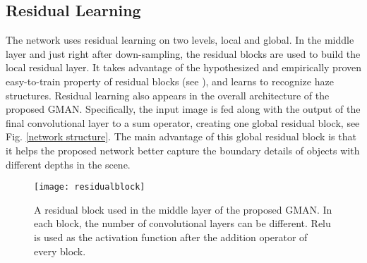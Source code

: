 \documentclass[journal]{IEEEtran}
\begin{document}
\subsection{Residual Learning}


The network uses residual learning on two levels, local and global. In the middle layer and just right after down-sampling, the residual blocks are used to build the local residual layer. It takes advantage of the hypothesized and empirically proven \cite{kim2016accurate,zhang2017beyond,szegedy2017inception,ren2017faster} easy-to-train property of residual blocks (see \cite{ResNet}), and learns to recognize haze structures. Residual learning also appears in the overall architecture of the proposed GMAN. Specifically, the input image is fed along with the output of the final convolutional layer to a sum operator, creating one global residual block, see Fig. \ref{network structure}. The main advantage of this global residual block is that it helps the proposed network better capture the boundary details of objects with different depths in the scene.

\begin{figure}
	\centering
 \texttt{[image: residualblock]}
	\captionsetup{justification=centering}
	\centering\caption{A residual block used in the middle layer of the proposed GMAN. In each block, the number of convolutional layers can be different. Relu is used as the activation function after the addition operator of every block.}
	\label{resblock}
\end{figure}
\end{document}
